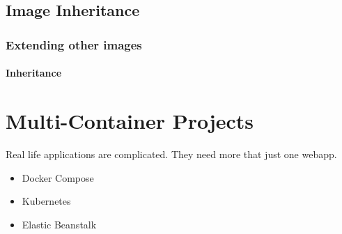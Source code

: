 \documentclass[mathserif,serif]{beamer}
\begin{document}
    \subsection{Image Inheritance}\label{subsec:inheritance}
    \begin{frame}
        \frametitle{Extending other images}
        \framesubtitle{Inheritance}
        \begin{center}
        \end{center}
    \end{frame}

    \section{Multi-Container Projects}\label{sec:multi-containerProjects}
    \begin{frame}
        Real life applications are complicated.
        They need more that just one webapp.

        \begin{itemize}
            \item Docker Compose
            \item Kubernetes
            \item Elastic Beanstalk
        \end{itemize}
    \end{frame}
\end{document}
